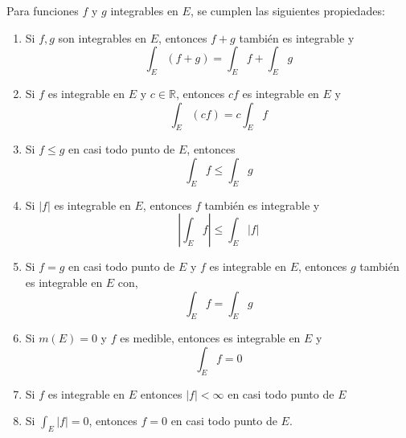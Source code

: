 \begin{proposición}
Para funciones $f$ y $g$ integrables en $E$, se cumplen las siguientes propiedades:
\vspace{-0.5em}
\begin{enumerate}
    \item Si $f, g$ son integrables en $E$, entonces $f+g$ también es integrable y $$
              \int_E (f+g) = \int_E f + \int_E g $$

    \item Si $f$ es integrable en $E$ y $c \in \mathbb{R}$, entonces $cf$ es integrable
          en $E$ y $$ \int_E (cf) = c \int_E f $$

    \item Si $f \leq g$ en casi todo punto de $E$, entonces $$ \int_E f \leq \int_E g $$

    \item Si $|f|$ es integrable en $E$, entonces $f$ también es integrable y $$ \left|
              \int_E f \right| \leq \int_E |f| $$

    \item Si $f = g$ en casi todo punto de $E$ y $f$ es integrable en $E$, entonces $g$
          también es integrable en $E$ con, $$ \int_E f = \int_E g $$

    \item Si $m(E) = 0$ y $f$ es medible, entonces es integrable en $E$ y $$ \int_E f = 0
          $$

    \item Si $f$ es integrable en $E$ entonces $|f| < \infty$ en casi todo punto de $E$

    \item Si $\int_E |f| = 0$, entonces $f = 0$ en casi todo punto de $E$.
\end{enumerate}
\end{proposición}
